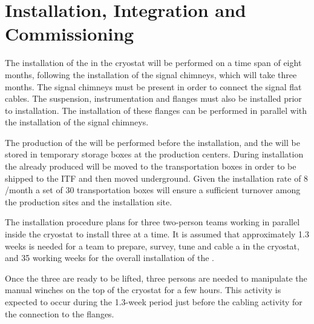 \section{Installation, Integration and Commissioning}
\label{sec:fddp-crp-install}

The installation of the  in the cryostat will be performed on a time span of eight months, following the installation of the signal chimneys, which will take three months. The signal chimneys must be present in order to %
connect the  signal flat cables. The suspension, instrumentation and  flanges must also be  installed prior to  installation. The installation of these flanges can be performed in parallel with the installation of the signal chimneys. 

The production of the  will be performed before the installation, and the  will be stored in temporary storage boxes at the production centers. During installation the already produced  will be moved to the transportation boxes in order to be shipped to the ITF and then moved underground. Given the installation rate of 8 /month a set of \num{30} transportation boxes will ensure a sufficient turnover among the production sites and the installation site.


The installation procedure %
plans for three two-person teams working in parallel inside the cryostat to %
install three  at a time. It is assumed that %
approximately \num{1.3} weeks is needed for a team to prepare, survey, tune and cable a  in the  cryostat, and \num{35} working weeks for the overall installation of the \dptotcrp {}.

Once the three  are ready to be lifted, three persons are needed to manipulate the manual winches on the top of the cryostat for a few hours. This activity is expected to occur during the \num{1.3}-week period just before the cabling activity for the connection to the flanges.



